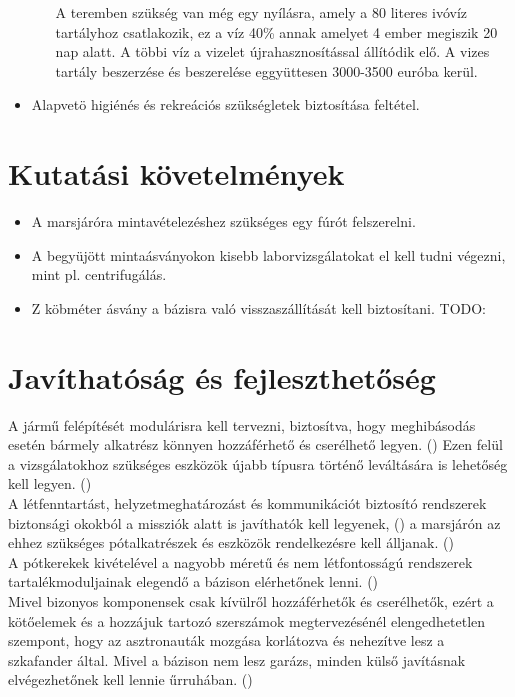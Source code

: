 \documentclass[12pt]{report}
\begin{document}
\begin{itemize}
\begin{itemize}
    A teremben szükség van még egy nyílásra, amely a 80 literes ivóvíz tartályhoz csatlakozik, ez a víz 40\% annak amelyet 4 ember megiszik 20 nap alatt. A többi víz a vizelet újrahasznosítással állítódik elő. A vizes tartály beszerzése és beszerelése eggyüttesen 3000-3500 euróba kerül.  
  \end{itemize}  
  \item Alapvetö higiénés és rekreációs szükségletek biztosítása feltétel. 
\end{itemize}
\section{Kutatási követelmények}
\begin{itemize}
  \item {} A marsjáróra mintavételezéshez szükséges egy fúrót felszerelni.
  \item {} A begyüjött mintaásványokon kisebb laborvizsgálatokat el kell tudni végezni, mint pl. centrifugálás.
  \item {} Z köbméter ásvány a bázisra való visszaszállítását kell biztosítani. TODO:
\end{itemize}


\section{Javíthatóság és fejleszthetőség}

A jármű felépítését modulárisra kell tervezni, biztosítva, hogy meghibásodás esetén bármely alkatrész könnyen hozzáférhető és cserélhető legyen. () Ezen felül a vizsgálatokhoz szükséges eszközök újabb típusra történő leváltására is lehetőség kell legyen. () \\
A létfenntartást, helyzetmeghatározást és kommunikációt biztosító rendszerek biztonsági okokból a missziók alatt is javíthatók kell legyenek, () a marsjárón az ehhez szükséges pótalkatrészek és eszközök rendelkezésre kell álljanak. () \\
A pótkerekek kivételével a nagyobb méretű és nem létfontosságú rendszerek tartalékmoduljainak elegendő a bázison elérhetőnek lenni. () \\
Mivel bizonyos komponensek csak kívülről hozzáférhetők és cserélhetők, ezért a kötőelemek és a hozzájuk tartozó szerszámok megtervezésénél elengedhetetlen szempont, hogy az asztronauták mozgása korlátozva és nehezítve lesz a szkafander által. Mivel a bázison nem lesz garázs, minden külső javításnak elvégezhetőnek kell lennie űrruhában. ()
\end{document}

